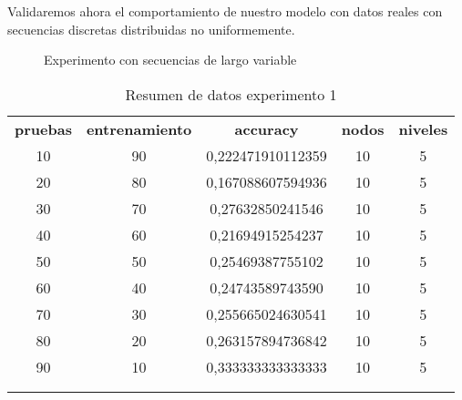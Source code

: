 	Validaremos ahora el comportamiento de nuestro modelo con datos reales con secuencias discretas distribuidas no uniformemente.
	
	
	
	\begin{figure}[h] 
		\centering
		\caption{Experimento con secuencias de largo variable}
		\label{fig:experimento2}
	\end{figure}
	

	\begin{table}[h]
		\centering
		\label{tabla-exp-1}
		\begin{tabular}{ccccc}
			\textbf{pruebas}     & \textbf{entrenamiento} & \textbf{accuracy}    & \textbf{nodos}       & \textbf{niveles}     \\
			10                   & 90                     & 0,222471910112359    & 10                   & 5                    \\
			20                   & 80                     & 0,167088607594936    & 10                   & 5                    \\
			30                   & 70                     & 0,27632850241546     & 10                   & 5                    \\
			40                   & 60                     & 0,21694915254237     & 10                   & 5                    \\
			50                   & 50                     & 0,25469387755102     & 10                   & 5                    \\
			60                   & 40                     & 0,24743589743590   	 & 10                   & 5                    \\
			70                   & 30                     & 0,255665024630541    & 10                   & 5                    \\
			80                   & 20                     & 0,263157894736842    & 10                   & 5                    \\
			90                   & 10                     & 0,333333333333333    & 10                   & 5                    \\
			&                        &                      &                      &                      \\
			\multicolumn{1}{l}{} & \multicolumn{1}{l}{}   & \multicolumn{1}{l}{} & \multicolumn{1}{l}{} & \multicolumn{1}{l}{}
		\end{tabular}
		\caption{ Resumen de datos experimento 1}
	\end{table}



